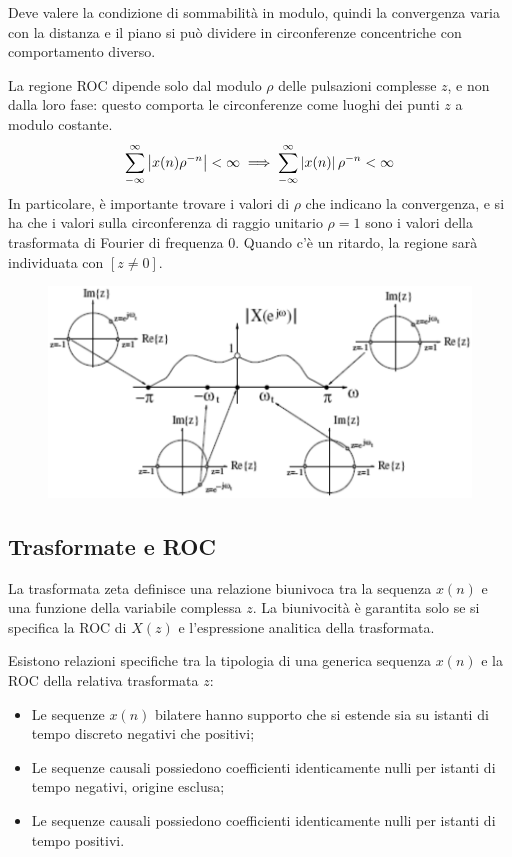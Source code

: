 Deve valere la condizione di sommabilità in modulo, quindi la convergenza varia con la distanza e il piano si può dividere in circonferenze concentriche con comportamento diverso. 

La regione ROC dipende solo dal modulo $\rho$ delle pulsazioni complesse $z$, e non dalla loro fase: questo comporta le circonferenze come luoghi dei punti $z$ a modulo costante.
$$ \sum_{-\infty}^{\infty}\left|x(n)\rho^{-n}\right| < \infty \implies  \sum_{-\infty}^{\infty}\left|x(n)\right|\rho^{-n} < \infty$$
In particolare, è importante trovare i valori di $\rho$ che indicano la convergenza, e si ha che i valori sulla circonferenza di raggio unitario $\rho = 1$ sono i valori della trasformata di Fourier di frequenza 0. Quando c'è un ritardo, la regione sarà individuata con $[z \neq 0]$.

\begin{figure}[h]
	\centering
	\includegraphics[scale=0.35]{Lezioni/Immagini/zdft}
\end{figure}

\subsection{Trasformate e ROC}
La trasformata zeta definisce una relazione biunivoca tra la sequenza $x(n)$ e una funzione della variabile complessa $z$. La biunivocità è garantita solo se si specifica la ROC di $X(z)$ e l'espressione analitica della trasformata.

Esistono relazioni specifiche tra la tipologia di una generica sequenza $x(n)$ e la ROC della relativa trasformata $z$:
\begin{itemize}
	\item Le sequenze $x(n)$ bilatere hanno supporto che si estende sia su istanti di tempo discreto negativi che positivi;
	\item Le sequenze causali possiedono coefficienti identicamente nulli per istanti di tempo negativi, origine esclusa;
	\item Le sequenze causali possiedono coefficienti identicamente nulli per istanti di tempo positivi.
\end{itemize}

